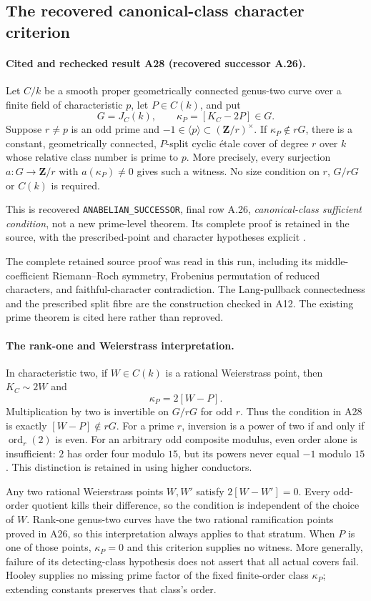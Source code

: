 \subsection{The recovered canonical-class character criterion}
\label{sec:recovered-canonical-character}

\paragraph{Cited and rechecked result A28 (recovered successor A.26).}
Let $C/k$ be a smooth proper geometrically connected genus-two
curve over a finite field of characteristic $p$, let $P\in C(k)$,
and put
\[
             G=J_C(k),\qquad\kappa_P=[K_C-2P]\in G.
\tag{RC.1}
\]
Suppose $r\ne p$ is an odd prime and
$-1\in\langle p\rangle\subset(\mathbf Z/r)^\times$.
If $\kappa_P\notin rG$, there is a constant, geometrically
connected, $P$-split cyclic \'etale cover of degree $r$
over $k$ whose relative class number is prime to $p$.
More precisely, every surjection $a:G\to\mathbf Z/r$
with $a(\kappa_P)\ne0$ gives such a witness.
No size condition on $r$, $G/rG$ or $C(k)$ is required.

This is recovered \texttt{ANABELIAN\_SUCCESSOR}, final row
A.26, \emph{canonical-class sufficient condition}, not a
new prime-level theorem.  Its complete proof is retained
in the source, with the prescribed-point and character
hypotheses explicit \cite[A.26]{ASrun}.

The complete retained source proof was read in this run, including
its middle-coefficient Riemann--Roch symmetry, Frobenius
permutation of reduced characters, and faithful-character
contradiction.  The Lang-pullback connectedness and the
prescribed split fibre are the construction checked in A12.
The existing prime theorem is cited here rather than reproved.


\paragraph{The rank-one and Weierstrass interpretation.}
In characteristic two, if $W\in C(k)$ is a rational
Weierstrass point, then $K_C\sim2W$ and
\[
                           \kappa_P=2[W-P].
\tag{RC.2}
\]
Multiplication by two is invertible on $G/rG$ for odd $r$.
Thus the condition in A28 is exactly
$[W-P]\notin rG$.
For a prime $r$, inversion is a power of two if and
only if $\operatorname{ord}_r(2)$ is even.
For an arbitrary odd composite modulus, even order
alone is insufficient: $2$ has order four modulo $15$,
but its powers never equal $-1$ modulo $15$.
This distinction is retained in using higher conductors.

Any two rational Weierstrass points $W,W'$ satisfy
$2[W-W']=0$.  Every odd-order quotient kills their
difference, so the condition is independent of the
choice of $W$.
Rank-one genus-two curves have the two rational
ramification points proved in A26, so this interpretation
always applies to that stratum.
When $P$ is one of those points, $\kappa_P=0$ and
this criterion supplies no witness.
More generally, failure of its detecting-class
hypothesis does not assert that all actual covers fail.
Hooley supplies no missing prime factor of the fixed
finite-order class $\kappa_P$; extending constants
preserves that class's order.

